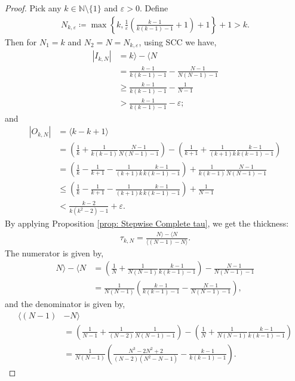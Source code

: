 \documentclass{ws-ijnt}
\begin{document}
	\begin{proof}
		Pick any $k\in\mathbb{N}\setminus\{1\}$ and $\varepsilon>0$. Define
		\begin{align*}
			N_{k,\varepsilon}
			\coloneqq \max{\left\{k,\frac{1}{\varepsilon}\left(\frac{k-1}{k(k-1)-1}+1\right)+1\right\}}+1>k.
		\end{align*}
		Then for $N_1=k$ and $N_2=N=N_{k,\varepsilon}$, using SCC we have,
		\begin{align*}
			\left\lvert{I_{k,N}}\right\rvert
			&=k\rangle-\langle N \\
			&=\frac{k-1}{k(k-1)-1}-\frac{N-1}{N(N-1)-1} \\
			&\geq \frac{k-1}{k(k-1)-1}-\frac{1}{N-1} \\
			&>\frac{k-1}{k(k-1)-1}-\varepsilon;
		\end{align*}
		and
		\begin{align*}
			\left\lvert{O_{k,N}}\right\rvert
			&=\langle k-k+1\rangle \\
			&=\left(\frac{1}{k}+\frac{1}{k(k-1)}\frac{N-1}{N(N-1)-1}\right)-\left(\frac{1}{k+1}+\frac{1}{(k+1)k}\frac{k-1}{k(k-1)-1}\right) \\
			&=\left(\frac{1}{k}-\frac{1}{k+1}-\frac{1}{(k+1)k}\frac{k-1}{k(k-1)-1}\right)+\frac{1}{k(k-1)}\frac{N-1}{N(N-1)-1} \\
			&\leq\left(\frac{1}{k}-\frac{1}{k+1}-\frac{1}{(k+1)k}\frac{k-1}{k(k-1)-1}\right)+\frac{1}{N-1} \\
			&<\frac{k-2}{k(k^2-2)-1}+\varepsilon
			.
		\end{align*}
		By applying Proposition \ref{prop: Stepwise Complete tau}, we get the thickness:
		\begin{align*}
			\tau_{k,N}
			=\frac{N\rangle-\langle N}{\langle(N-1)-N\rangle}
			.
		\end{align*}
		The numerator is given by,
		\begin{align*}
			N\rangle-\langle N
			&=\left(\frac{1}{N}+\frac{1}{N(N-1)}\frac{k-1}{k(k-1)-1}\right)-\frac{N-1}{N(N-1)-1} \\
			&=\frac{1}{N(N-1)}\left(\frac{k-1}{k(k-1)-1}-\frac{N-1}{N(N-1)-1}\right)
			,
		\end{align*}
		and the denominator is given by,
		\begin{align*}
			\langle(N-1)&-N\rangle \\
			&=\left(\frac{1}{N-1}+\frac{1}{(N-2)}\frac{1}{N(N-1)-1}\right)-\left(\frac{1}{N}+\frac{1}{N(N-1)}\frac{k-1}{k(k-1)-1}\right) \\
			&=\frac{1}{N(N-1)}\left(\frac{N^3-2N^2+2}{(N-2)(N^2-N-1)}-\frac{k-1}{k(k-1)-1}\right).

\end{align*}
\end{proof}
\end{document}
